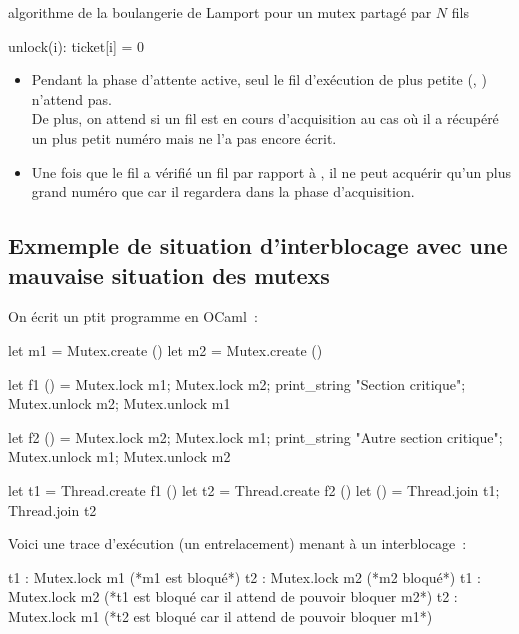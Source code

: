 \begin{adjustwidth}{-3cm}{-3cm}
\begin{implementation}{algorithme de la boulangerie de Lamport pour un mutex partagé par $N$ fils}
\begin{lstLNat}
    unlock(i):
        ticket[i] = 0
    \end{lstLNat}
\end{implementation}

\begin{remarque}{}{}
    \begin{itemize}
        \item Pendant la phase d'attente active, seul le fil d'exécution de plus petite (, ) n'attend pas.\\
        De plus, on attend si un fil est en cours d'acquisition au cas où il a récupéré un plus petit numéro mais ne l'a pas encore écrit.
        \item Une fois que le fil  a vérifié un fil  par rapport à , il ne peut acquérir qu'un plus grand numéro que  car il regardera  dans la phase d'acquisition.
    \end{itemize}
\end{remarque}

\subsection{Exmemple de situation d'interblocage avec une mauvaise situation des mutexs}

On écrit un ptit programme en OCaml~:
\begin{lstOCaml}
    let m1 = Mutex.create ()
    let m2 = Mutex.create ()

    let f1 () = 
        Mutex.lock m1;
        Mutex.lock m2;
        print_string "Section critique\n";
        Mutex.unlock m2;
        Mutex.unlock m1

    let f2 () = 
        Mutex.lock m2;
        Mutex.lock m1;
        print_string "Autre section critique\n";
        Mutex.unlock m1;
        Mutex.unlock m2
    
    let t1 = Thread.create f1 ()
    let t2 = Thread.create f2 ()
    let () = Thread.join t1; Thread.join t2
\end{lstOCaml}

Voici une trace d'exécution (un entrelacement) menant à un interblocage~:
\begin{lstLNat}
    t1 : Mutex.lock m1 (*m1 est bloqué*)
    t2 : Mutex.lock m2 (*m2 bloqué*)
    t1 : Mutex.lock m2 (*t1 est bloqué car il attend de pouvoir bloquer m2*)
    t2 : Mutex.lock m1 (*t2 est bloqué car il attend de pouvoir bloquer m1*)
\end{lstLNat}


\end{adjustwidth}
